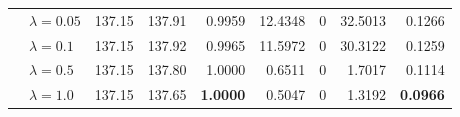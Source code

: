 \begin{table}[t]
{\begin{tabular}{l l rrrrrrr}
 & $\lambda{=}0.05$ & 137.15 & 137.91 & 0.9959 & 12.4348 & \cellcolor{cyan!12} $0$ & 32.5013 & 0.1266 \\
 & $\lambda{=}0.1$ & 137.15 & 137.92 & 0.9965 & 11.5972 & \cellcolor{cyan!12} $0$ & 30.3122 & 0.1259 \\
 & $\lambda{=}0.5$ & 137.15 & 137.80 & 1.0000 & 0.6511 & \cellcolor{cyan!12} $0$ & 1.7017 & 0.1114 \\
 & $\lambda{=}1.0$ & 137.15 & 137.65 & \textbf{1.0000} & 0.5047 & \cellcolor{cyan!12} $0$ & 1.3192 & \textbf{0.0966} \\
\bottomrule
\end{tabular}}
\end{table}